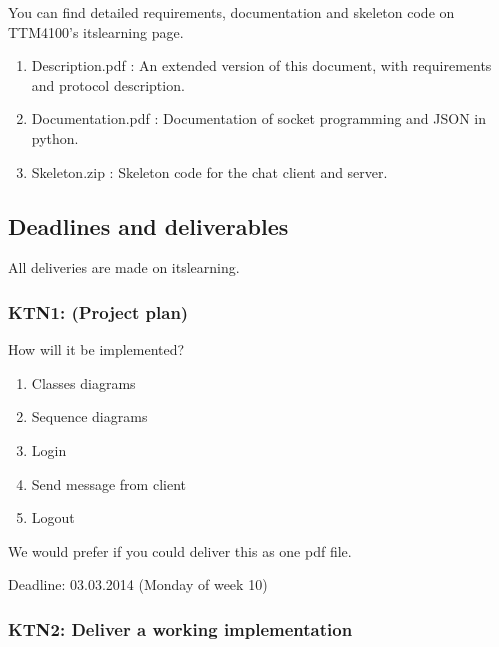 You can find detailed requirements, documentation and skeleton code on TTM4100's itslearning page. 

\begin{enumerate}

\item
Description.pdf : An extended version of this document, with requirements and protocol description. 

\item
Documentation.pdf : Documentation of socket programming and JSON in python. 

\item
Skeleton.zip : Skeleton code for the chat client and server.

\end{enumerate}

\subsection{Deadlines and deliverables}

All deliveries are made on itslearning.

\subsubsection{KTN1: (Project plan)}

How will it be implemented? 

\begin{enumerate}

\item
Classes diagrams 

\item
Sequence diagrams 

\item
Login 

\item
Send message from client 

\item
Logout 

\end{enumerate}

We would prefer if you could deliver this as one pdf file. 

Deadline: 03.03.2014 (Monday of week 10) 

\subsubsection{KTN2: Deliver a working implementation}

